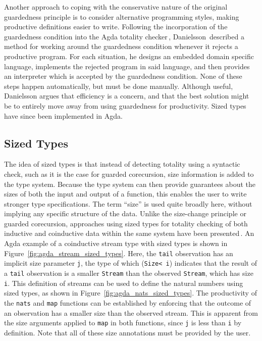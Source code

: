 Another approach to coping with the conservative nature of the original guardedness principle is to consider alternative programming styles, making productive definitions easier to write. Following the incorporation of the guardedness condition into the Agda totality checker\,\citep{AltenkirchNAD10}, Danielsson\,\citep{Danielsson10beatingthe} described a method for working around the guardedness condition whenever it rejects a productive program. For each situation, he designs an embedded domain specific language, implements the rejected program in said language, and then provides an interpreter which is accepted by the guardedness condition. None of these steps happen automatically, but must be done manually. Although useful, Danielsson argues that efficiency is a concern, and that the best solution might be to entirely move away from using guardedness for productivity. Sized types have since been implemented in Agda.


\subsection{Sized Types}
\label{sec:sized_types}
The idea of sized types is that instead of detecting totality using a syntactic check, such as it is the case for guarded corecursion, size information is added to the type system. Because the type system can then provide guarantees about the sizes of both the input and output of a function, this enables the user to write stronger type specifications. The term ``size'' is used quite broadly here, without implying any specific structure of the data. Unlike the size-change principle or guarded corecursion, approaches using sized types for totality checking of both inductive and coinductive data within the same system have been presented\,\citep{Abel13Wellfounded}. An Agda example of a coinductive stream type with sized types is shown in Figure~\ref{fig:agda_stream_sized_types}. Here, the \texttt{tail} observation has an implicit size parameter \texttt{j}, the type of which (\texttt{Size< i}) indicates that the result of a \texttt{tail} observation is a smaller \texttt{Stream} than the observed \texttt{Stream}, which has size \texttt{i}. This definition of streams can be used to define the natural numbers using sized types, as shown in Figure~\ref{fig:agda_nats_sized_types}. The productivity of the \texttt{nats} and \texttt{map} functions can be established by enforcing that the outcome of an observation has a smaller size than the observed stream. This is apparent from the size arguments applied to \texttt{map} in both functions, since \texttt{j} is less than \texttt{i} by definition. Note that all of these size annotations must be provided by the user.

